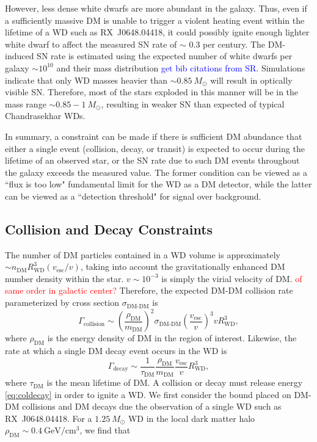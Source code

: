 \documentclass[twocolumn,showpacs,preprintnumbers,amsmath,amssymb,prd]{revtex4}
\def\r{\right)}
\def\l{\left(}
\begin{document}
However, less dense white dwarfs are more abundant in the galaxy. Thus, even if a sufficiently massive DM is unable to trigger a violent heating event within the lifetime of a WD such as RX~J0648.04418, it could possibly ignite enough lighter white dwarf to affect the measured SN rate of $\sim $ 0.3 per century. The DM-induced SN rate is estimated using the expected number of white dwarfs per galaxy $\sim 10^{10}$ and their mass distribution \textcolor{blue}{get bib citations from SR}. Simulations indicate that only WD masses heavier than $\sim 0.85 ~M_{\odot}$ will result in optically visible SN. Therefore, most of the stars exploded in this manner will be in the mass range $\sim 0.85 - 1 ~M_{\odot}$, resulting in weaker SN than expected of typical Chandrasekhar WDs. 

In summary, a constraint can be made if there is sufficient DM abundance that either a single event (collision, decay, or transit) is expected to occur during the lifetime of an observed star, or the SN rate due to such DM events throughout the galaxy exceeds the measured value. The former condition can be viewed as a ``flux is too low" fundamental limit for the WD as a DM detector, while the latter can be viewed as a ``detection threshold" for signal over background.  

\subsection{Collision and Decay Constraints}
\label{sec:CollisionConstraints}
The number of DM particles contained in a WD volume is approximately $\sim n_\text{DM} R_\text{WD}^3 (v_\text{esc}/v)$, taking into account the gravitationally enhanced DM number density within the star. $v \sim 10^{-3}$ is simply the virial velocity of DM. \textcolor{red}{of same order in galactic center?} Therefore, the expected DM-DM collision rate parameterized by cross section $\sigma_\text{DM-DM}$ is 
\begin{equation}
\Gamma_\text{collision} \sim \l \frac{\rho_{\text{DM}}}{m_\text{DM}} \r^2 \sigma_\text{DM-DM} \l \frac{v_\text{esc}}{v}\r^3 v R_\text{WD}^3,
\end{equation}
where $\rho_{\text{DM}}$ is the energy density of DM in the region of interest. Likewise, the rate at which a single DM decay event occurs in the WD is
\begin{equation}
\Gamma_\text{decay} \sim  \frac{1}{\tau_\text{DM}} \frac{\rho_{\text{DM}}}{m_\text{DM}} \frac{v_\text{esc}}{v} R_\text{WD}^3,
\end{equation}
where $\tau_\text{DM}$ is the mean lifetime of DM. A collision or decay must release energy \eqref{eq:coldecay} in order to ignite a WD. We first consider the bound placed on DM-DM collisions and DM decays due the observation of a single WD such as RX~J0648.04418. For a $1.25 ~M_{\odot}$ WD in the local dark matter halo $\rho_{\text{DM}} \sim 0.4~\text{GeV}/\text{cm}^3$, we find that 
\end{document}
